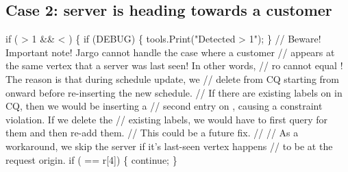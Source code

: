 \subsection{Case 2: server is heading towards a customer}
\nwenddocs{}\endmoddef\nwstartdeflinemarkup{}\nwenddeflinemarkup
if ( > 1 &&  < ) \{
  if (DEBUG) \{
    tools.Print("Detected  > 1");
  \}
  // Beware! Important note! Jargo cannot handle the case where a customer
  // appears at the same vertex that a server was last seen! In other words,
  // ro cannot equal ! The reason is that during schedule update, we
  // delete from CQ starting from  onward before re-inserting the new schedule.
  // If there are existing labels on  in CQ, then we would be inserting a
  // second entry on , causing a constraint violation. If we delete the
  // existing labels, we would have to first query for them and then re-add them.
  // This could be a future fix.
  //
  // As a workaround, we skip the server if it's last-seen vertex happens
  // to be at the request origin.
  if ( == r[4]) \{
    continue;
  \}

